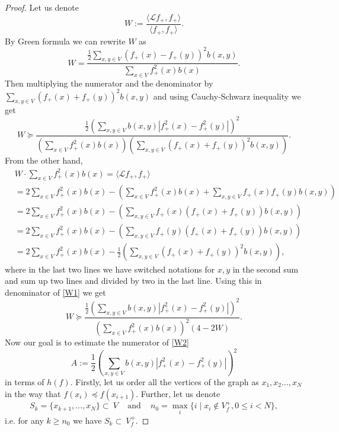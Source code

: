 \documentclass[a4paper,12pt]{amsart}
\theoremstyle{definition}
\renewcommand{\L}{\mathcal{L}}
\begin{document}
\begin{proof}
Let us denote
\begin{equation*}
W:=\dfrac{\langle\L f_+, f_+\rangle}{\langle f_+, f_+\rangle}.
\end{equation*}
By Green formula we can rewrite $W$ as 
\begin{equation*}
W=\dfrac{\frac{1}{2}\sum_{x,y\in V}(f_+(x)-f_+(y))^2b(x,y)}{\sum_{x\in V}f_+^2(x)b(x)}.
\end{equation*}
Then multiplying the numerator and the denominator by $\sum_{x,y\in V}(f_+(x)+f_+(y))^2b(x,y)$ and using Cauchy-Schwarz inequality we get
\begin{equation}\label{W1}
W\succeq \dfrac{\frac{1}{2}\left(\sum_{x,y\in V}b(x,y)\left|f_+^2(x)-f_+^2(y)\right|\right)^2}{\left(\sum_{x\in V}f_+^2(x)b(x)\right)\left(\sum_{x,y\in V}(f_+(x)+f_+(y))^2b(x,y)\right)}.
\end{equation}
From the other hand,
\begin{align*}
&W\cdot {\sum_{x\in V}f_+^2(x)b(x)}=\langle\L f_+,f_+\rangle\\
&=2\sum_{x\in V}f_+^2(x)b(x)-\left(\sum_{x\in V}f_+^2(x)b(x)+\sum_{x,y\in V}f_+(x)f_+(y)b(x,y)\right)\\
&=2\sum_{x\in V}f_+^2(x)b(x)-\left(\sum_{x,y\in V}f_+(x)(f_+(x)+f_+(y))b(x,y)\right)
\\
&=2\sum_{x\in V}f_+^2(x)b(x)-\left(\sum_{x,y\in V}f_+(y)(f_+(x)+f_+(y))b(x,y)\right)\\
&=2\sum_{x\in V}f_+^2(x)b(x)-\frac12\left(\sum_{x,y\in V}(f_+(x)+f_+(y))^2b(x,y)\right),
\end{align*}
where in the last two lines we have switched notations for $x,y$ in the second sum and sum up two lines and divided by two in the last line. Using this in denominator of \eqref{W1} we get
\begin{equation}\label{W2}
W\succeq\dfrac{\frac{1}{2}\left(\sum_{x,y\in V}b(x,y)\left|f_+^2(x)-f_+^2(y)\right|\right)^2}{\left(\sum_{x\in V}f_+^2(x)b(x)\right)^2\left(4-2 W\right)}.
\end{equation}
Now our goal is to estimate the numerator of \eqref{W2}
$$
A:=\frac{1}{2}\left(\sum_{x,y\in V}b(x,y)\left|f_+^2(x)-f_+^2(y)\right|\right)^2
$$ 
in terms of $h(f)$.
Firstly, let us order all the vertices of the graph as $x_1,x_2\dots,x_N$ in the way that $f(x_i)\preceq f(x_{i+1})$. Further, let us denote 
$$
S_k=\{x_{k+1},\dots,x_N\}\subset~V\;\;\;\mbox{ and }\;\;\;n_0=\max_i\{i\mid x_i\not \in V^+_f, 0\le i<N \},
$$
i.e. for any $k\ge n_0$ we have $S_k\subset~V^+_f$.


\end{proof}
\end{document}
